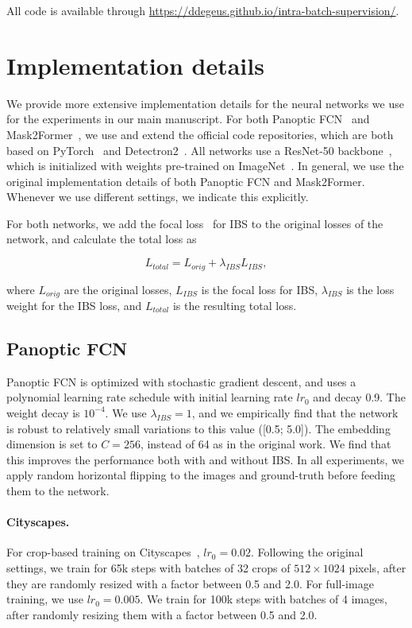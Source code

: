 \documentclass[10pt,twocolumn,letterpaper]{article}
\begin{document}
All code is available through \url{https://ddegeus.github.io/intra-batch-supervision/}.

\section{Implementation details}
\label{sec:app:impl_details}
We provide more extensive implementation details for the neural networks we use for the experiments in our main manuscript. For both Panoptic FCN~\cite{li2021panopticfcn} and Mask2Former~\cite{cheng2021mask2former}, we use and extend the official code repositories, which are both based on PyTorch~\cite{paszke2019pytorch} and Detectron2~\cite{wu2019detectron2}. All networks use a ResNet-50 backbone~\cite{he2016resnet}, which is initialized with weights pre-trained on ImageNet~\cite{deng2009imagenet}. In general, we use the original implementation details of both Panoptic FCN and Mask2Former. Whenever we use different settings, we indicate this explicitly.

For both networks, we add the focal loss~\cite{lin2017focal} for IBS to the original losses of the network, and calculate the total loss as

\begin{equation}
    L_{total} = L_{orig} + \lambda_{IBS}L_{IBS},
\end{equation}

\noindent where $L_{orig}$ are the original losses, $L_{IBS}$ is the focal loss for IBS, $\lambda_{IBS}$ is the loss weight for the IBS loss, and $L_{total}$ is the resulting total loss.


\subsection{Panoptic FCN}
Panoptic FCN is optimized with stochastic gradient descent, and uses a polynomial learning rate schedule with initial learning rate $lr_0$ and decay 0.9. The weight decay is $10^{-4}$. We use $\lambda_{IBS} = 1$, and we empirically find that the network is robust to relatively small variations to this value ([0.5; 5.0]). The embedding dimension is set to $C = 256$, instead of 64 as in the original work. We find that this improves the performance both with and without IBS. In all experiments, we apply random horizontal flipping to the images and ground-truth before feeding them to the network.

\paragraph{Cityscapes.}
For crop-based training on Cityscapes~\cite{cordts2016cityscapes}, $lr_0 = 0.02$. Following the original settings, we train for 65k steps with batches of 32 crops of $512\times1024$ pixels, after they are randomly resized with a factor between 0.5 and 2.0. For full-image training, we use $lr_0 = 0.005$. We train for 100k steps with batches of 4 images, after randomly resizing them with a factor between 0.5 and 2.0.
\end{document}
